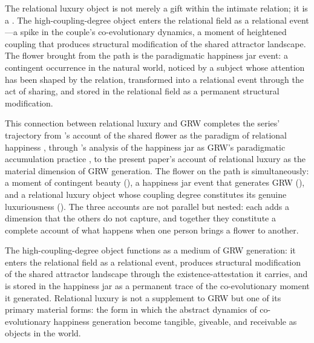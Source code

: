 \noindent
The relational luxury object is not merely a gift within the intimate relation; it is a . The high-coupling-degree object enters the relational field as a relational event---a spike in the couple's co-evolutionary dynamics, a moment of heightened coupling that produces structural modification of the shared attractor landscape. The flower brought from the path is the paradigmatic happiness jar event: a contingent occurrence in the natural world, noticed by a subject whose attention has been shaped by the relation, transformed into a relational event through the act of sharing, and stored in the relational field as a permanent structural modification.

This connection between relational luxury and GRW completes the series' trajectory from 's account of the shared flower as the paradigm of relational happiness \parencite{paperxiv}, through 's analysis of the happiness jar as GRW's paradigmatic accumulation practice \parencite{paperxv}, to the present paper's account of relational luxury as the material dimension of GRW generation. The flower on the path is simultaneously: a moment of contingent beauty (), a happiness jar event that generates GRW (), and a relational luxury object whose coupling degree constitutes its genuine luxuriousness (). The three accounts are not parallel but nested: each adds a dimension that the others do not capture, and together they constitute a complete account of what happens when one person brings a flower to another.

\begin{claim}
The high-coupling-degree object functions as a medium of GRW generation: it enters the relational field as a relational event, produces structural modification of the shared attractor landscape through the existence-attestation it carries, and is stored in the happiness jar as a permanent trace of the co-evolutionary moment it generated. Relational luxury is not a supplement to GRW but one of its primary material forms: the form in which the abstract dynamics of co-evolutionary happiness generation become tangible, giveable, and receivable as objects in the world.
\end{claim}
